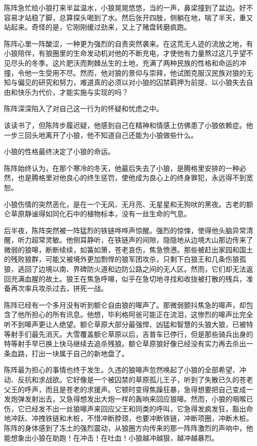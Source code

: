 \par 陈阵急忙给小狼打来半盆温水，小狼晃晃悠悠，当的一声，鼻梁撞到了盆边。好不容易才站稳了脚，总算探头喝到了水。然后张开四肢，侧躺在地，喘了半天，重又站起来。奇怪的是，它刚刚缓过劲来，又上了赌盘转磨疯跑。
\par 陈阵心里一阵酸涩，一种更为强烈的自责突然袭来。在这荒无人迹的流放之地，有小狼陪伴，有狼圈里的生命发动机对他的不断充电，才使他有力量熬过这几乎望不见尽头的冬季。这片肥沃而荆棘丛生的土地，充满了两种民族的性格和命运的冲撞，令他一生受用不尽。然而，他对狼的景仰与崇拜，他试图克服汉民族对狼的无知与偏见的研究和努力，难道真的必须以对小狼的囚禁羁押为前提、以小狼失去自由和快乐为代价，才能实施与实现的吗？
\par 陈阵深深陷入了对自己这一行为的怀疑和忧虑之中。
\par 该读书了，但陈阵步履迟疑，他感到自己在精神和情感上仿佛患了小狼依赖症。他一步三回头地离开了小狼，他不知道自己还能为小狼做些什么。
\par 小狼的性格最终决定了小狼的命运。
\par 陈阵始终认为，在那个寒冷的冬天，他最后失去了小狼，是腾格里安排的一种必然，也是腾格里对他良心的终生惩罚，使他成为良心上的终身罪犯，永远得不到宽恕。
\par 小狼伤情的突然恶化，是在一个无风、无月亮、无星星和无狗吠的黑夜。古老的额仑草原静谧得如同化石中的植物标本，没有一丝生命的气息。
\par 后半夜，陈阵突然被一阵猛烈的铁链哗哗声惊醒。强烈的惊悚，使得他头脑异常清醒，听力超常灵敏。他侧耳静听，在铁链声的间隙，隐隐地从边境大山那边传来了微弱的狼嗥，断断续续，如簧如箫，苍老哀伤，焦急愤懑。那些被赶出家园和国土的残败狼群，可能又被境外更加剽悍的狼军团攻杀，只剩下白狼王和几条伤狼孤狼，逃回了边境以南、界碑防火道和边防公路之间的无人区。然而，它们却无法返回充满血腥的故土。狼王在焦急呼嗥，似乎在急切地寻找和收拢被打散的残兵，准备再次率兵攻杀过去，拼死一战。
\par 陈阵已经有一个多月没有听到额仑自由狼的嗥声了。那微弱颤抖焦急的嗥声，却包含了他所担心的所有讯息。他想，毕利格阿爸可能正在流泪，这惨烈的嗥声比完全听不到嗥声更让人绝望。额仑草原大部分最强悍、凶猛和智慧的头狼大狼，已被特等射手们最先消灭。大雪覆盖额仑草原以后，吉普车已停行，但是那些骑兵出身的特等射手早已换上快马继续去追杀残狼。额仑草原狼好像已经没有实力再去杀出一条血路，打出一块属于自己的新地盘了。
\par 陈阵最为担心的事情也终于发生。久违的狼嗥声忽然唤起了小狼的全部希望、冲动、反抗和求战欲。它好像是一个被囚禁的草原孤儿王子，听到了失散已久的苍老父王的呼声，而且是苍老的求援声。它顿时变得焦躁狂暴，急得想要把自己变成一发炮弹发射出去，又急得想发出大炮一样的轰响来回应狼嗥。然而，小狼的咽喉已伤，它已经发不出一丝狼嗥声来回应父王和同类的呼叫，它急得发疯发狂，豁出命地冲跃、冲拽铁链和木桩，不惜冲断脖颈，也要冲断铁链，冲断项圈，冲断木桩。陈阵的身体感到了冻土的强烈震动，从狼圈方向传来的那一阵阵激烈的声响中，他能想象出小狼在助跑！在冲击！在吐血！小狼越冲越狠，越冲越暴烈。
